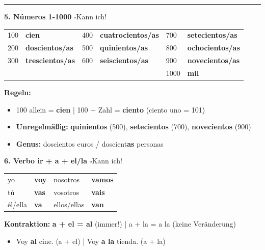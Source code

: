 \documentclass[10pt, a4paper]{article}
\newcommand{\es}[1]{\textcolor{spanisch}{\textbf{#1}}}
\newcommand{\checkbox}{$\square$\hspace{5pt}}
\begin{document}
\begin{themabox}
\vspace{3pt}
\hrule
\vspace{3pt}

\textbf{\textcolor{spanisch}{5. Números 1-1000}} \hfill \checkbox Kann ich!

\small
\begin{tabular}{llllll}
100 & \es{cien} & 400 & \es{cuatrocientos/as} & 700 & \es{setecientos/as} \\
200 & \es{doscientos/as} & 500 & \es{quinientos/as} & 800 & \es{ochocientos/as} \\
300 & \es{trescientos/as} & 600 & \es{seiscientos/as} & 900 & \es{novecientos/as} \\
& & & & 1000 & \es{mil} \\
\end{tabular}

\vspace{3pt}
\textbf{Regeln:}
\begin{itemize}[leftmargin=15pt, itemsep=0pt]
    \item 100 allein = \es{cien} | 100 + Zahl = \es{ciento} (ciento uno = 101)
    \item \textbf{Unregelmäßig:} \es{quinientos} (500), \es{setecientos} (700), \es{novecientos} (900)
    \item \textbf{Genus:} doscientos euros / doscient\textbf{as} personas
\end{itemize}

\end{themabox}

\vspace{6pt}

\begin{themabox}

\textbf{\textcolor{spanisch}{6. Verbo ir + a + el/la}} \hfill \checkbox Kann ich!

\small
\begin{tabular}{ll|ll}
yo & \es{voy} & nosotros & \es{vamos} \\
tú & \es{vas} & vosotros & \es{vais} \\
él/ella & \es{va} & ellos/ellas & \es{van} \\
\end{tabular}

\vspace{3pt}
\textbf{Kontraktion:} \es{a + el = al} (immer!) | a + la = a la (keine Veränderung)
\begin{itemize}[leftmargin=15pt, itemsep=0pt]
    \item Voy \es{al} cine. (a + el) | Voy \es{a la} tienda. (a + la)
\end{itemize}

\end{themabox}
\end{document}
